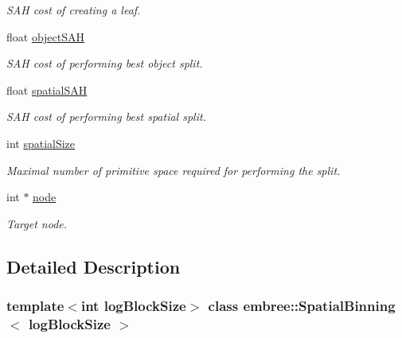 \begin{DoxyCompactItemize}
\begin{DoxyCompactList}\small\item\em SAH cost of creating a leaf. \item\end{DoxyCompactList}\item 
\hypertarget{classembree_1_1_spatial_binning_a03e4944bfe387fce15387d90e84acc8f}{
float \hyperlink{classembree_1_1_spatial_binning_a03e4944bfe387fce15387d90e84acc8f}{objectSAH}}
\label{classembree_1_1_spatial_binning_a03e4944bfe387fce15387d90e84acc8f}

\begin{DoxyCompactList}\small\item\em SAH cost of performing best object split. \item\end{DoxyCompactList}\item 
\hypertarget{classembree_1_1_spatial_binning_a369e84edd78878f0fb2deaedbfac8be8}{
float \hyperlink{classembree_1_1_spatial_binning_a369e84edd78878f0fb2deaedbfac8be8}{spatialSAH}}
\label{classembree_1_1_spatial_binning_a369e84edd78878f0fb2deaedbfac8be8}

\begin{DoxyCompactList}\small\item\em SAH cost of performing best spatial split. \item\end{DoxyCompactList}\item 
int \hyperlink{classembree_1_1_spatial_binning_a32adb1161fa055c1ad51a625ca56ca92}{spatialSize}
\begin{DoxyCompactList}\small\item\em Maximal number of primitive space required for performing the split. \item\end{DoxyCompactList}\item 
int $\ast$ \hyperlink{classembree_1_1_spatial_binning_ac43bbdf3b0fd5cf462ba203d96ce4ba8}{node}
\begin{DoxyCompactList}\small\item\em Target node. \item\end{DoxyCompactList}\end{DoxyCompactItemize}


\subsection{Detailed Description}
\subsubsection*{template$<$int logBlockSize$>$ class embree::SpatialBinning$<$ logBlockSize $>$}

